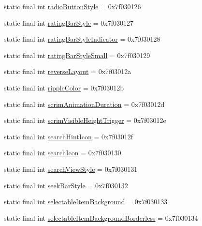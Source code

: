 \begin{DoxyCompactItemize}
static final int \mbox{\hyperlink{classandroid_1_1support_1_1design_1_1R_1_1attr_af48a1a4964a53fc579b8146882a10944}{radio\+Button\+Style}} = 0x7f030126
\item 
static final int \mbox{\hyperlink{classandroid_1_1support_1_1design_1_1R_1_1attr_a21a3bd3b5ca0c7dc36f25acf117b4b39}{rating\+Bar\+Style}} = 0x7f030127
\item 
static final int \mbox{\hyperlink{classandroid_1_1support_1_1design_1_1R_1_1attr_ab9c3e7b470468960aae515a685e657f1}{rating\+Bar\+Style\+Indicator}} = 0x7f030128
\item 
static final int \mbox{\hyperlink{classandroid_1_1support_1_1design_1_1R_1_1attr_ad36f5bb96868457223dce2f469d1bee3}{rating\+Bar\+Style\+Small}} = 0x7f030129
\item 
static final int \mbox{\hyperlink{classandroid_1_1support_1_1design_1_1R_1_1attr_af9a4560dd35e304aa6dccaf7bfa79ae8}{reverse\+Layout}} = 0x7f03012a
\item 
static final int \mbox{\hyperlink{classandroid_1_1support_1_1design_1_1R_1_1attr_adf83f2141b7f24cc3d0947b974476b23}{ripple\+Color}} = 0x7f03012b
\item 
static final int \mbox{\hyperlink{classandroid_1_1support_1_1design_1_1R_1_1attr_ae3b14738867106beebf9f57a82f7d878}{scrim\+Animation\+Duration}} = 0x7f03012d
\item 
static final int \mbox{\hyperlink{classandroid_1_1support_1_1design_1_1R_1_1attr_a90b72c1ee9aab8f6624040d833dc2afe}{scrim\+Visible\+Height\+Trigger}} = 0x7f03012e
\item 
static final int \mbox{\hyperlink{classandroid_1_1support_1_1design_1_1R_1_1attr_a35f90fcbb52285c4c53e62b7e2c3c289}{search\+Hint\+Icon}} = 0x7f03012f
\item 
static final int \mbox{\hyperlink{classandroid_1_1support_1_1design_1_1R_1_1attr_af4e20c1cd34c6894a650951c9fc9f500}{search\+Icon}} = 0x7f030130
\item 
static final int \mbox{\hyperlink{classandroid_1_1support_1_1design_1_1R_1_1attr_afef575fcb76e77c6ba1ba916c8ab454d}{search\+View\+Style}} = 0x7f030131
\item 
static final int \mbox{\hyperlink{classandroid_1_1support_1_1design_1_1R_1_1attr_af9631febdd94cbced7a8bfa77ceec752}{seek\+Bar\+Style}} = 0x7f030132
\item 
static final int \mbox{\hyperlink{classandroid_1_1support_1_1design_1_1R_1_1attr_a718cace72d8869013d368f9dd6b0dc8b}{selectable\+Item\+Background}} = 0x7f030133
\item 
static final int \mbox{\hyperlink{classandroid_1_1support_1_1design_1_1R_1_1attr_a9d19a9ebdb5ef3038ff33d8c296961cf}{selectable\+Item\+Background\+Borderless}} = 0x7f030134

\end{DoxyCompactItemize}
